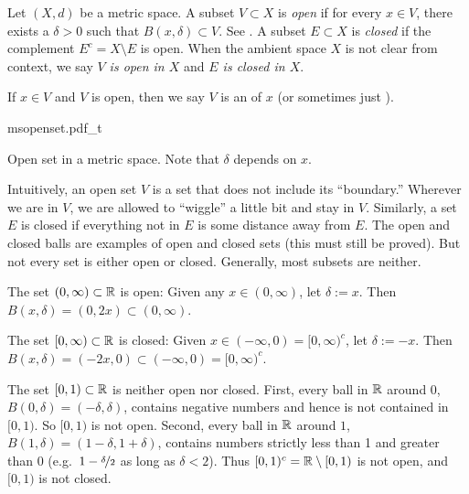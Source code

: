 \begin{defn}
Let $(X,d)$ be a metric space.  A subset $V \subset X$
is \emph{open}
if for every $x \in V$, there exists a $\delta > 0$ such that
$B(x,\delta) \subset V$.  See .  A subset $E \subset X$ is 
\emph{closed} if the complement $E^c = X \setminus E$ is open.
When the ambient space $X$ is not clear from context,
we say \emph{$V$ is open in $X$} and \emph{$E$ is closed in $X$}.

If $x \in V$ and $V$ is open, then we say 
$V$ is an \emph{} of $x$ (or
sometimes just \emph{}).
\end{defn}

\begin{myfigureht}
{msopenset.pdf_t}
\caption{Open set in a metric space.  Note that $\delta$ depends on $x$.\label{fig:msopenset}}
\end{myfigureht}

Intuitively, an open set $V$ is a set that does not include its ``boundary.''
Wherever we are in $V$,
we are allowed to ``wiggle'' a little bit and
stay in $V$.  Similarly, a set $E$ is closed if everything not in $E$
is some distance away from $E$.
The open and closed balls are examples of open and closed sets
(this must still be proved).
But not every set is either open or closed.  Generally, most subsets are neither.

\begin{example}
The set $(0,\infty) \subset {\mathbb{R}}$ is open:  Given any $x \in (0,\infty)$,
let $\delta := x$.  Then $B(x,\delta) = (0,2x) \subset (0,\infty)$.

The set $[0,\infty) \subset {\mathbb{R}}$ is closed:  Given $x \in (-\infty,0) =
[0,\infty)^c$,
let $\delta := -x$.  Then $B(x,\delta) = (-2x,0) \subset
(-\infty,0) = [0,\infty)^c$.

The set $[0,1) \subset {\mathbb{R}}$ is neither open nor closed.  First,
every ball in ${\mathbb{R}}$ around $0$, $B(0,\delta) = (-\delta,\delta)$, contains negative
numbers and hence is not contained in $[0,1)$.  So $[0,1)$ is not open.
Second, every ball in ${\mathbb{R}}$ around $1$,
$B(1,\delta) = (1-\delta,1+\delta)$, contains
numbers strictly less than 1 and greater than 0
(e.g.\ $1-\nicefrac{\delta}{2}$ as long as $\delta < 2$).
Thus $[0,1)^c = {\mathbb{R}} \setminus
[0,1)$ is not open, and $[0,1)$ is not closed.
\end{example}

